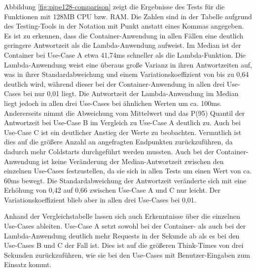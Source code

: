 Abbildung \ref{fig:pipe128-comparison} zeigt die Ergebnisse des Tests für die Funktionen mit 128MB CPU bzw. RAM. Die Zahlen sind in der Tabelle aufgrund des Testing-Tools in der Notation mit Punkt anstatt eines Kommas angegeben. Es ist zu erkennen, dass die Container-Anwendung in allen Fällen eine deutlich geringere Antwortzeit als die Lambda-Anwendung aufweist. Im Median ist der Container bei Use-Case A etwa 41,74ms schneller als die Lambda-Funktion. Die Lambda-Anwendung weist eine überaus große Varianz in ihren Antwortzeiten auf, was in ihrer Standardabweichung und einem Variationskoeffizient von bis zu 0,64 deutlich wird, während dieser bei der Container-Anwendung in allen drei Use-Cases bei nur 0,01 liegt. Die Antwortzeit der Lambda-Anwendung im Median liegt jedoch in allen drei Use-Cases bei ähnlichen Werten um ca. 100ms. Andererseits nimmt die Abweichung vom Mittelwert und das P(95) Quantil der Antwortzeit bei Use-Case B im Vergleich zu Use-Case A deutlich zu. Auch bei Use-Case C ist ein deutlicher Anstieg der Werte zu beobachten. Vermutlich ist dies auf die größere Anzahl an angefragten Endpunkten zurückzuführen, da dadurch mehr Coldstarts durchgeführt werden mussten. 
Auch bei der Container-Anwendung ist keine Veränderung der Median-Antwortzeit zwischen den einzelnen Use-Cases festzustellen, da sie sich in allen Tests um einen Wert von ca. 60ms bewegt. Die Standardabweichung der Antwortzeit veränderte sich mit eine Erhöhung von 0,42 auf 0,66 zwischen Use-Case A und C nur leicht. Der Variationskoeffizient blieb aber in allen drei Use-Cases bei 0,01.

Anhand der Vergleichstabelle lassen sich auch Erkenntnisse über die einzelnen Use-Cases ableiten. Use-Case A setzt sowohl bei der Container- als auch bei der Lambda-Anwendung deutlich mehr Requests in der Sekunde ab als es bei den Use-Cases B und C der Fall ist. Dies ist auf die größeren Think-Times von drei Sekunden zurückzuführen, wie sie bei den Use-Cases mit Benutzer-Eingaben zum Einsatz kommt.

